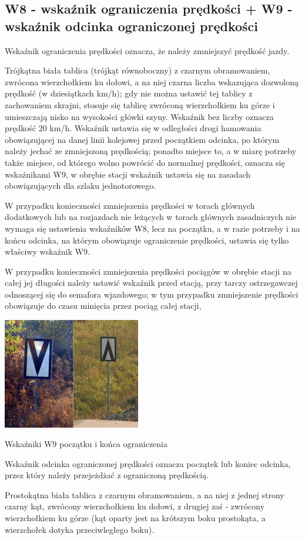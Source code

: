 \subsection{W8 - wskaźnik ograniczenia prędkości + W9 - wskaźnik odcinka ograniczonej prędkości}
\begin{tcolorbox}[colback=black!5!white,colframe=white!55!black,title=Wskaźnik W8]
{\textquotedbl}Wskaźnik ograniczenia prędkości{\textquotedbl} oznacza, że należy zmniejszyć prędkość jazdy. 
\end{tcolorbox}Trójkątna biała tablica (trójkąt równoboczny) z czarnym obramowaniem, zwrócona wierzchołkiem ku dołowi, a na niej czarna liczba wskazująca dozwoloną prędkość (w dziesiątkach km/h); gdy nie można ustawić tej tablicy z zachowaniem skrajni, stosuje się tablicę zwróconą wierzchołkiem ku górze i umieszczają nisko na wysokości główki szyny. Wskaźnik bez liczby oznacza prędkość 20 km/h. Wskaźnik ustawia się w odległości drogi hamowania obowiązującej na danej linii kolejowej przed początkiem odcinka, po którym należy jechać ze zmniejszoną prędkością; ponadto miejsce to, a w miarę potrzeby także miejsce, od którego wolno powrócić do normalnej prędkości, oznacza się wskaźnikami W9, w obrębie stacji wskaźnik ustawia się na zasadach obowiązujących dla szlaku jednotorowego. 

W przypadku konieczności zmniejszenia prędkości w torach głównych dodatkowych lub na rozjazdach nie leżących w torach głównych zasadniczych nie wymaga się ustawienia wskaźników W8, lecz na początku, a w razie potrzeby i na końcu odcinka, na którym obowiązuje ograniczenie prędkości, ustawia się tylko właściwy wskaźnik W9.

W przypadku konieczności zmniejszenia prędkości pociągów w obrębie stacji na całej jej długości należy ustawić wskaźnik przed stacją, przy tarczy ostrzegawczej odnoszącej się do semafora wjazdowego; w tym przypadku zmniejszenie prędkości obowiązuje do czasu minięcia przez pociąg całej stacji,
	\begin{marginfigure}
	\includegraphics[width=6cm]{skryptkierownik-img/wskazniki-w9.jpg}
	\caption{Wskaźniki W9 początku i końca ograniczenia}
\end{marginfigure}
\begin{tcolorbox}[colback=black!5!white,colframe=white!55!black,title=Wskaźnik W9]
{\textquotedbl}Wskaźnik odcinka ograniczonej prędkości{\textquotedbl} oznacza początek lub koniec odcinka, przez który należy przejeżdżać z ograniczoną prędkością.
\end{tcolorbox} Prostokątna biała tablica z czarnym obramowaniem, a na niej z jednej strony czarny kąt, zwrócony wierzchołkiem ku dołowi, z drugiej zaś - zwrócony wierzchołkiem ku górze (kąt oparty jest na krótszym boku prostokąta, a wierzchołek dotyka przeciwległego boku).

